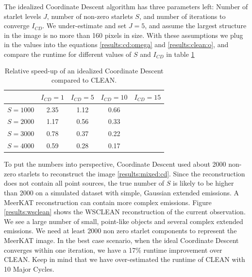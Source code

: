 The idealized Coordinate Descent algorithm has three parameters left: Number of starlet levels $J$, number of non-zero starlets $S$, and number of iterations to converge $I_{CD}$. We under-estimate and set $J=5$, and assume the largest structure in the image is no more than 160 pixels in size. With these assumptions we plug in the values into the equations \eqref{results:cd:omega} and \eqref{results:clean:o}, and compare the runtime for different values of $S$ and $I_{CD}$ in table \ref{res:cd:table}

\begin{table}[h!]
	\begin{center}
		\begin{tabular}{l|c|c|c|c} %
			 & $I_{CD} = 1$ & $I_{CD} = 5$ &  $I_{CD} = 10$ &  $I_{CD} = 15$\\
			\hline
			$S=1000$ & 2.35 & 1.12 & 0.66 & \\
			$S=2000$ & 1.17 & 0.56 & 0.33 &\\
			$S=3000$ & 0.78 & 0.37 & 0.22 &\\
			$S=4000$ & 0.59 & 0.28 & 0.17 & \\
		\end{tabular}
		\caption{Relative speed-up of an idealized Coordinate Descent compared to CLEAN.}
		\label{res:cd:table}
	\end{center}
\end{table}

To put the numbers into perspective, Coordinate Descent used about 2000 non-zero starlets to reconstruct the image \ref{results:mixed:cd}. Since the reconstruction does not contain all point sources, the true number of $S$ is likely to be higher than 2000 on a simulated dataset with simple, Gaussian extended emissions. A MeerKAT reconstruction can contain more complex emissions. Figure \ref{results:wsclean} shows the WSCLEAN reconstruction of the current observation. We see a large number of small, point-like objects and several complex extended emissions. We need at least 2000 non zero starlet components to represent the MeerKAT image. In the best case scenario, when the ideal Coordinate Descent converges within one iteration, we have a 17\% runtime improvement over CLEAN. Keep in mind that we have over-estimated the runtime of CLEAN with 10 Major Cycles.

